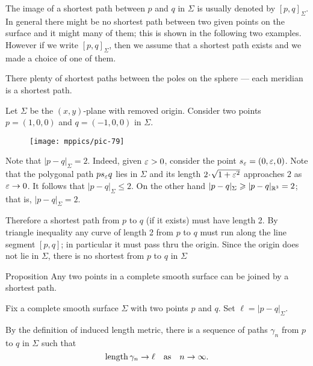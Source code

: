 The image of a shortest path between $p$ and $q$ in $\Sigma$ is usually denoted by $[p,q]_\Sigma$.
In general there might be no shortest path between two given points on the surface
and it might many of them;
this is shown in the following two examples.
However if we write $[p,q]_\Sigma$, then we assume that a shortest path exists and we made a choice of one of them.

 There plenty of shortest paths between the poles on the sphere --- each meridian is a shortest path.


 Let $\Sigma$ be the $(x,y)$-plane with removed origin.
Consider two points $p=(1,0,0)$ and $q=(-1,0,0)$ in $\Sigma$.

\begin{wrapfigure}{r}{28 mm}
\vskip-0mm
\centering
\texttt{[image: mppics/pic-79]}
\vskip-0mm
\end{wrapfigure}

Note that $|p-q|_\Sigma=2$. 
Indeed, given $\eps\z>0$, consider the point $s_\varepsilon=(0,\varepsilon,0)$.
Note that the polygonal path $ps_\varepsilon q$ lies in $\Sigma$ and its length $2\cdot\sqrt{1+\eps^2}$ approaches $2$ as $\varepsilon\to0$.
It follows that $|p-q|_\Sigma\le 2$.
On the other hand $|p-q|_\Sigma\geqslant |p-q|_{\mathbb{R}^3}=2$; that is, $|p-q|_\Sigma= 2$.

Therefore a shortest path from $p$ to $q$ (if it exists) must have length 2.
By triangle inequality any curve of length 2 from $p$ to $q$ must run along the line segment $[p,q]$;
in particular it must pass thru the origin.
Since the origin does not lie in $\Sigma$, there is no shortest from $p$ to $q$ in $\Sigma$ 

\begin{thm}{Proposition}
Any two points in a complete smooth surface can be joined by a shortest path. 
\end{thm}

Fix a complete smooth surface $\Sigma$ with two points $p$ and $q$.
Set $\ell=|p-q|_\Sigma$.

By the definition of induced length metric,
there is a sequence of paths $\gamma_n$ from $p$ to $q$ in $\Sigma$ such that
\[\mathop{\rm length}\nolimits\gamma_n\to \ell\quad\text{as}\quad n\to \infty.\]

